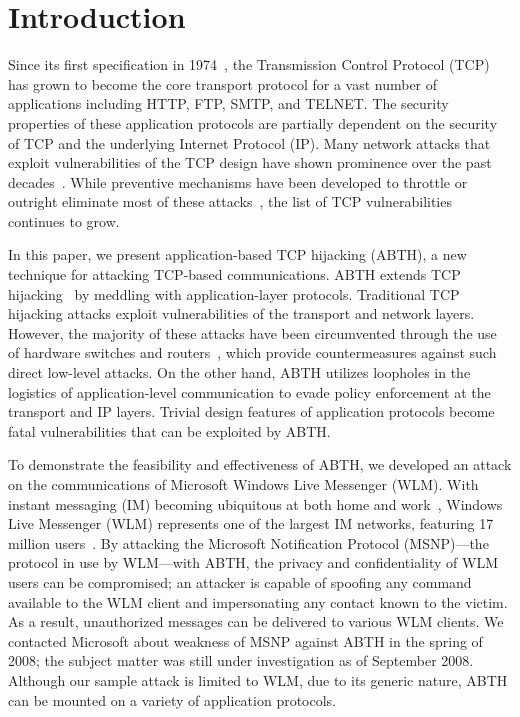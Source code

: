 \documentclass{sig-alternate}
\begin{document}


\section{Introduction}

Since its first specification in 1974~\cite{rfc:tcp}, the Transmission Control Protocol (TCP) has grown to become the core transport protocol for a vast number of applications including HTTP, FTP, SMTP, and TELNET.
The security properties of these application protocols are partially dependent on the security of TCP and the underlying Internet Protocol (IP).
Many network attacks that exploit vulnerabilities of the TCP design have shown prominence over the past decades~\cite{harris:tcpattacks}.
While preventive mechanisms have been developed to throttle or outright eliminate most of these attacks~\cite{dubrawsky:layer2}, the list of TCP vulnerabilities continues to grow.

In this paper, we present application-based TCP hijacking (ABTH), a new technique for attacking TCP-based communications.
ABTH extends TCP hijacking~\cite{stamp:infosec} by meddling with application-layer protocols.
Traditional TCP hijacking attacks exploit vulnerabilities of the transport and network layers.
However, the majority of these attacks have been circumvented through the use of hardware switches and routers~\cite{dubrawsky:layer2}, which provide countermeasures against such direct low-level attacks.
On the other hand, ABTH utilizes loopholes in the logistics of application-level communication to evade policy enforcement at the transport and IP layers.
Trivial design features of application protocols become fatal vulnerabilities that can be exploited by ABTH.

\begin{sloppypar}
To demonstrate the feasibility and effectiveness of ABTH, we developed an attack on the communications of Microsoft Windows Live Messenger (WLM).
With instant messaging (IM) becoming ubiquitous at both home and work~\cite{aol:survey}, Windows Live Messenger (WLM) represents one of the largest IM networks, featuring 17 million users~\cite{microsoft:advertising}.
By attacking the Microsoft Notification Protocol (MSNP)---the protocol in use by WLM---with ABTH, the privacy and confidentiality of WLM users can be compromised; an attacker is capable of spoofing any command available to the WLM client and impersonating any contact known to the victim.
As a result, unauthorized messages can be delivered to various WLM clients.
We contacted Microsoft about weakness of MSNP against ABTH in the spring of 2008; the subject matter was still under investigation as of September 2008.
Although our sample attack is limited to WLM, due to its generic nature, ABTH can be mounted on a variety of application protocols.
\end{sloppypar}
\end{document}
